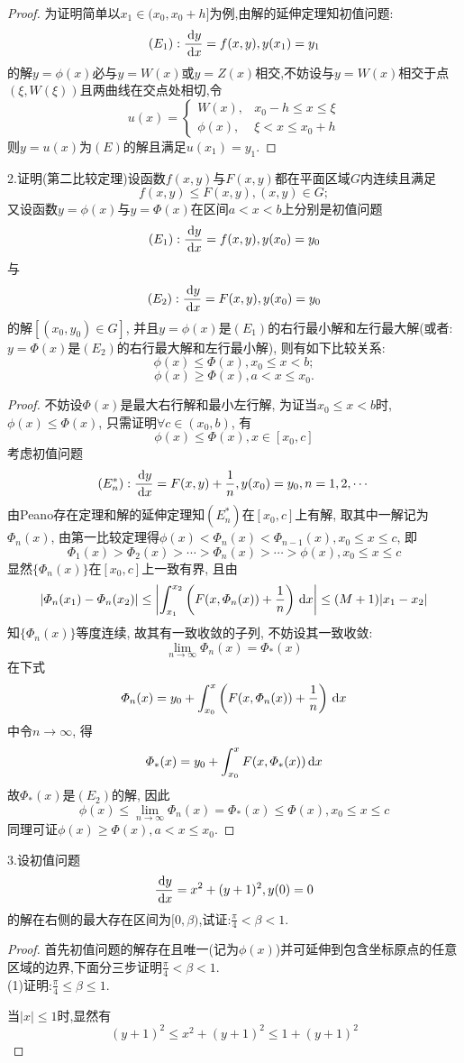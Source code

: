 \begin{proof}
为证明简单以$x_1\in(x_0,x_0+h]$为例,由解的延伸定理知初值问题:
\[(E_1):\frac{\,\mathrm{d} y}{\,\mathrm{d} x}=f(x,y),y(x_1)=y_1\]
的解$y=\phi(x)$必与$y=W(x)$或$y=Z(x)$相交,不妨设与$y=W(x)$相交于点$(\xi,W(\xi))$且两曲线在交点处相切,令
\[u(x)=\begin{cases}
W(x),&x_0-h\leq x\leq\xi\\
\phi(x),&\xi<x\leq x_0+h
\end{cases}\]
则$y=u(x)$为$(E)$的解且满足$u(x_1)=y_1$.
\end{proof}


2.证明(第二比较定理)设函数$f(x,y)$与$F(x,y)$都在平面区域$G$内连续且满足
\[f(x,y)\leq F(x,y),(x,y)\in G;\]
又设函数$y=\phi(x)$与$y=\varPhi(x)$在区间$a<x<b$上分别是初值问题\[(E_1):\frac{\,\mathrm{d} y}{\,\mathrm{d} x}=f(x,y),y(x_0)=y_0\]
与\[(E_2):\frac{\,\mathrm{d} y}{\,\mathrm{d} x}=F(x,y),y(x_0)=y_0\]
的解$[(x_0,y_0)\in G]$, 并且$y=\phi(x)$是$(E_1)$的右行最小解和左行最大解(或者: $y=\varPhi(x)$是$(E_2)$的右行最大解和左行最小解), 则有如下比较关系:
\[\phi(x)\leq\varPhi(x),x_0\leq x<b;\]
\[\phi(x)\geq\varPhi(x),a<x\leq x_0.\]

\begin{proof}不妨设$\varPhi(x)$是最大右行解和最小左行解, 为证当$x_0\leq x<b$时, 
$\phi(x)\leq\varPhi(x)$, 只需证明$\forall c\in(x_0,b)$, 有
\[\phi(x)\leq\varPhi(x),x\in[x_0,c]\]
考虑初值问题
\[(E_n^*):\frac{\,\mathrm{d} y}{\,\mathrm{d} x}=F(x,y)+\frac{1}{n},y(x_0)=y_0,n=1,2,\cdots\]
由Peano存在定理和解的延伸定理知$(E_n^*)$在$[x_0,c]$上有解, 取其中一解记为$\varPhi_n(x)$, 
由第一比较定理得$\phi(x)<\varPhi_n(x)<\varPhi_{n-1}(x),x_0\leq x\leq c$, 即
\[\varPhi_1(x)>\varPhi_2(x)>\cdots>\varPhi_n(x)>\cdots>\phi(x),x_0\leq x\leq c\]
显然$\{\varPhi_n(x)\}$在$[x_0,c]$上一致有界, 且由
\[|\varPhi_n(x_1)-\varPhi_n(x_2)|\leq\left|\int_{x_1}^{x_2}\left(F(x,\varPhi_n(x))+\frac{1}{n}\right)\,\mathrm{d} x\right|\leq(M+1)|x_1-x_2|\]
知$\{\varPhi_n(x)\}$等度连续, 故其有一致收敛的子列, 不妨设其一致收敛:
\[\lim_{n\to\infty}\varPhi_n(x)=\varPhi_*(x)\]
在下式
\[\varPhi_n(x)=y_0+\int_{x_0}^x\left(F(x,\varPhi_n(x))+\frac{1}{n}\right)\,\mathrm{d} x\]
中令$n\to\infty$, 得
\[\varPhi_*(x)=y_0+\int_{x_0}^xF(x,\varPhi_*(x))\,\mathrm{d} x\]
故$\varPhi_*(x)$是$(E_2)$的解, 因此
\[\phi(x)\leq\lim_{n\to\infty}\varPhi_n(x)=\varPhi_*(x)\leq\varPhi(x),x_0\leq x\leq c\]
同理可证$\phi(x)\geq\varPhi(x),a<x\leq x_0$.
\end{proof}


3.设初值问题
\[\frac{\,\mathrm{d} y}{\,\mathrm{d} x}=x^2+(y+1)^2,y(0)=0\]
的解在右侧的最大存在区间为$[0,\beta)$,试证:$\frac{\pi}{4}<\beta<1$.
\begin{proof}
首先初值问题的解存在且唯一(记为$\phi(x)$)并可延伸到包含坐标原点的任意区域的边界,下面分三步证明$\frac{\pi}{4}<\beta<1$.\\
(1)证明:$\frac{\pi}{4}\leq\beta\leq1$.

当$|x|\leq1$时,显然有
\[(y+1)^2\leq x^2+(y+1)^2\leq1+(y+1)^2\]
\end{proof}